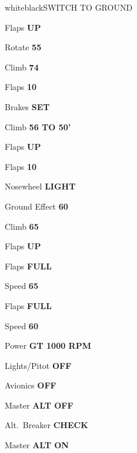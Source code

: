 \documentclass{article}
\begin{document}
\begin{multicols*}{3}
\begin{groupheading}{white}{black}{SWITCH TO GROUND}
\end{groupheading}

\colorbox{magenta}{}

\colorbox{magenta!60}{}

Flaps \dotfill \textbf{UP}

Rotate \dotfill \textbf{55}

Climb \dotfill \textbf{74}

\colorbox{magenta!60}{}

Flaps \dotfill \textbf{10}

Brakes \dotfill \textbf{SET}

Climb \dotfill \textbf{56 TO 50'}

Flaps \dotfill \textbf{UP}

\colorbox{magenta!60}{}

Flaps \dotfill \textbf{10}

Nosewheel \dotfill \textbf{LIGHT}

Ground Effect \dotfill \textbf{60}

Climb \dotfill \textbf{65}

Flaps \dotfill \textbf{UP}

\colorbox{magenta}{}

\colorbox{magenta!60}{}

Flaps \dotfill \textbf{FULL}

Speed \dotfill \textbf{65}

\colorbox{magenta!60}{}

Flaps \dotfill \textbf{FULL}

Speed \dotfill \textbf{60}

\colorbox{yellow!80!orange}{}

Power \dotfill \textbf{GT 1000 RPM}

Lights/Pitot \dotfill \textbf{OFF}

Avionics \dotfill \textbf{OFF}

Master \dotfill \textbf{ALT OFF}

Alt.\ Breaker \dotfill \textbf{CHECK}

Master \dotfill \textbf{ALT ON}


\end{multicols*}
\end{document}
